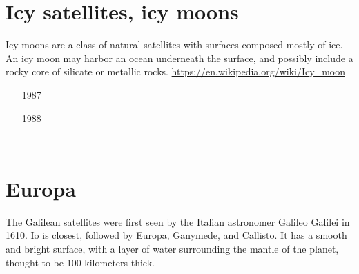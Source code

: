 \section{Icy satellites, icy moons}

Icy moons are a class of natural satellites with surfaces composed mostly of ice. 
An icy moon may harbor an ocean underneath the surface, and possibly include a rocky 
core of silicate or metallic rocks.
\url{https://en.wikipedia.org/wiki/Icy_moon}

\begin{small}
\begin{itemize}
\item[1987]
\item[1988]
\item[\twothousandone] 
\item[\twothousandtwelve] 
\item[\twothousandseventeen] 
\item[\twothousandnineteen] 
\item[\twothousandtwenty] 
\item[\twothousandtwentyone]
 \\ 
\item[\twothousandtwentythree]
\end{itemize}
\end{small}

\section{Europa}

The Galilean satellites were first seen by the Italian astronomer 
Galileo Galilei in 1610. Io is closest, followed by Europa, Ganymede, 
and Callisto. It has a smooth and bright surface, with a layer of 
water surrounding the mantle of the planet, thought to be 100 kilometers thick.

